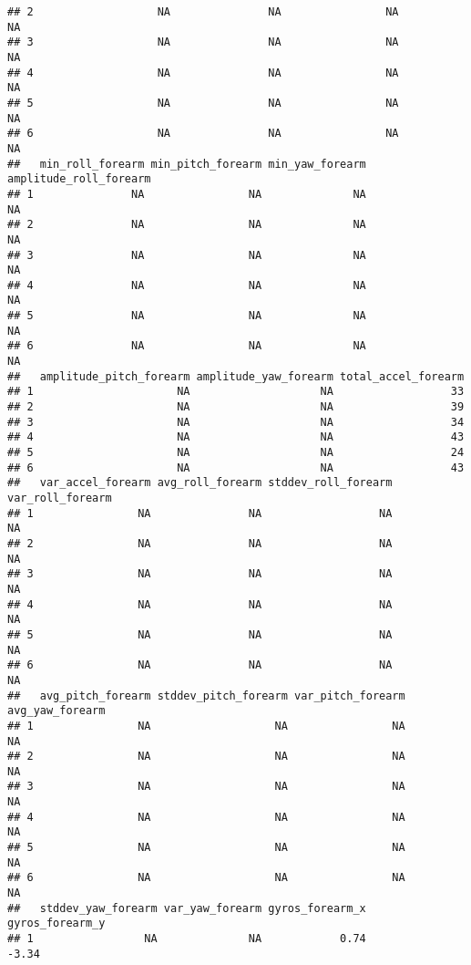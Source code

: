 \documentclass[]{article}
\begin{document}
\begin{verbatim}
## 2                   NA               NA                NA              NA
## 3                   NA               NA                NA              NA
## 4                   NA               NA                NA              NA
## 5                   NA               NA                NA              NA
## 6                   NA               NA                NA              NA
##   min_roll_forearm min_pitch_forearm min_yaw_forearm amplitude_roll_forearm
## 1               NA                NA              NA                     NA
## 2               NA                NA              NA                     NA
## 3               NA                NA              NA                     NA
## 4               NA                NA              NA                     NA
## 5               NA                NA              NA                     NA
## 6               NA                NA              NA                     NA
##   amplitude_pitch_forearm amplitude_yaw_forearm total_accel_forearm
## 1                      NA                    NA                  33
## 2                      NA                    NA                  39
## 3                      NA                    NA                  34
## 4                      NA                    NA                  43
## 5                      NA                    NA                  24
## 6                      NA                    NA                  43
##   var_accel_forearm avg_roll_forearm stddev_roll_forearm var_roll_forearm
## 1                NA               NA                  NA               NA
## 2                NA               NA                  NA               NA
## 3                NA               NA                  NA               NA
## 4                NA               NA                  NA               NA
## 5                NA               NA                  NA               NA
## 6                NA               NA                  NA               NA
##   avg_pitch_forearm stddev_pitch_forearm var_pitch_forearm avg_yaw_forearm
## 1                NA                   NA                NA              NA
## 2                NA                   NA                NA              NA
## 3                NA                   NA                NA              NA
## 4                NA                   NA                NA              NA
## 5                NA                   NA                NA              NA
## 6                NA                   NA                NA              NA
##   stddev_yaw_forearm var_yaw_forearm gyros_forearm_x gyros_forearm_y
## 1                 NA              NA            0.74           -3.34

\end{verbatim}
\end{document}
